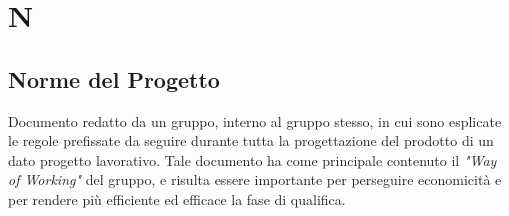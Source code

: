 \section*{N}

\subsection{Norme del Progetto}
Documento redatto da un gruppo, interno al gruppo stesso, in cui sono esplicate le regole prefissate da seguire durante tutta la progettazione del prodotto di un dato progetto lavorativo. Tale documento ha come principale contenuto il \textit{"Way of Working"} del gruppo, e risulta essere importante per perseguire economicità e per rendere più efficiente ed efficace la fase di qualifica.
